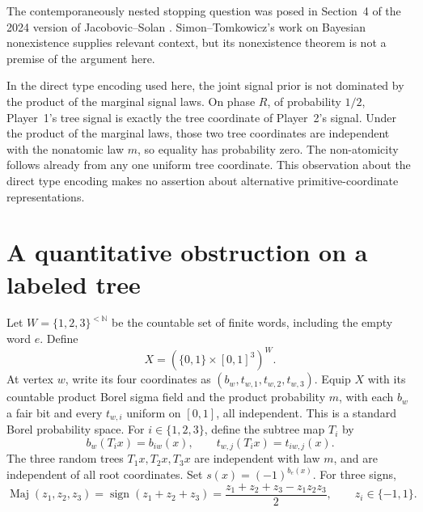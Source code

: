 \documentclass[11pt]{article}
\theoremstyle{remark}
\newcommand{\Maj}{\operatorname{Maj}}
\begin{document}
The contemporaneously nested stopping question was posed in
Section~4 of the 2024 version of Jacobovic--Solan
\cite{JS}. Simon--Tomkowicz's work on Bayesian nonexistence
\cite{ST} supplies relevant context, but its nonexistence theorem is not
a premise of the argument here.

In the direct
type encoding used here, the joint signal prior is not dominated by the
product of the marginal signal laws. On phase
$R$, of probability $1/2$, Player~1's tree signal is exactly the tree
coordinate of Player~2's signal. Under the product of the marginal laws,
those two tree coordinates are independent with the nonatomic law $m$,
so equality has probability zero. The non-atomicity follows already from
any one uniform tree coordinate. This observation about the direct type
encoding makes no assertion about alternative primitive-coordinate
representations.

\section{A quantitative obstruction on a labeled tree}

Let $W=\{1,2,3\}^{<\mathbb N}$ be the countable set of finite words,
including the empty word $e$. Define
\[
 X=(\{0,1\}\times[0,1]^3)^W.
\]
At vertex $w$, write its four coordinates as
$(b_w,t_{w,1},t_{w,2},t_{w,3})$. Equip $X$ with its countable product
Borel sigma field and the product probability $m$, with each $b_w$ a
fair bit and every $t_{w,i}$ uniform on $[0,1]$, all independent.
This is a standard Borel probability space. For $i\in\{1,2,3\}$,
define the subtree map $T_i$ by
\[
 b_w(T_i x)=b_{iw}(x),\qquad
 t_{w,j}(T_i x)=t_{iw,j}(x).
\]
The three random trees $T_1x,T_2x,T_3x$ are independent with law $m$,
and are independent of all root coordinates. Set
$s(x)=(-1)^{b_e(x)}$. For three signs,
\[
 \Maj(z_1,z_2,z_3)=\operatorname{sign}(z_1+z_2+z_3)
 =\frac{z_1+z_2+z_3-z_1z_2z_3}{2},
 \qquad z_i\in\{-1,1\}.
\]
\end{document}
